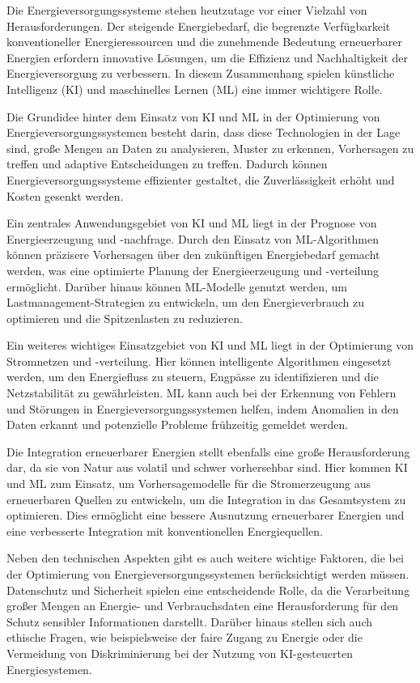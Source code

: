 Die Energieversorgungssysteme stehen heutzutage vor einer Vielzahl von
Herausforderungen. Der steigende Energiebedarf, die begrenzte Verfügbarkeit
konventioneller Energieressourcen und die zunehmende Bedeutung erneuerbarer
Energien erfordern innovative Lösungen, um die Effizienz und Nachhaltigkeit der
Energieversorgung zu verbessern. In diesem Zusammenhang spielen künstliche
Intelligenz (KI) und maschinelles Lernen (ML) eine immer wichtigere Rolle.

Die Grundidee hinter dem Einsatz von KI und ML in der Optimierung von
Energieversorgungssystemen besteht darin, dass diese Technologien in der Lage
sind, große Mengen an Daten zu analysieren, Muster zu erkennen, Vorhersagen zu
treffen und adaptive Entscheidungen zu treffen. Dadurch können
Energieversorgungssysteme effizienter gestaltet, die Zuverlässigkeit erhöht und
Kosten gesenkt werden.

Ein zentrales Anwendungsgebiet von KI und ML liegt in der Prognose von
Energieerzeugung und -nachfrage. Durch den Einsatz von ML-Algorithmen können
präzisere Vorhersagen über den zukünftigen Energiebedarf gemacht werden, was
eine optimierte Planung der Energieerzeugung und -verteilung ermöglicht.
Darüber hinaus können ML-Modelle genutzt werden, um Lastmanagement-Strategien
zu entwickeln, um den Energieverbrauch zu optimieren und die Spitzenlasten zu
reduzieren.

Ein weiteres wichtiges Einsatzgebiet von KI und ML liegt in der Optimierung von
Stromnetzen und -verteilung. Hier können intelligente Algorithmen eingesetzt
werden, um den Energiefluss zu steuern, Engpässe zu identifizieren und die
Netzstabilität zu gewährleisten. ML kann auch bei der Erkennung von Fehlern und
Störungen in Energieversorgungssystemen helfen, indem Anomalien in den Daten
erkannt und potenzielle Probleme frühzeitig gemeldet werden.

Die Integration erneuerbarer Energien stellt ebenfalls eine große
Herausforderung dar, da sie von Natur aus volatil und schwer vorhersehbar sind.
Hier kommen KI und ML zum Einsatz, um Vorhersagemodelle für die Stromerzeugung
aus erneuerbaren Quellen zu entwickeln, um die Integration in das Gesamtsystem
zu optimieren. Dies ermöglicht eine bessere Ausnutzung erneuerbarer Energien
und eine verbesserte Integration mit konventionellen Energiequellen.

Neben den technischen Aspekten gibt es auch weitere wichtige Faktoren, die bei
der Optimierung von Energieversorgungssystemen berücksichtigt werden müssen.
Datenschutz und Sicherheit spielen eine entscheidende Rolle, da die
Verarbeitung großer Mengen an Energie- und Verbrauchsdaten eine Herausforderung
für den Schutz sensibler Informationen darstellt. Darüber hinaus stellen sich
auch ethische Fragen, wie beispielsweise der faire Zugang zu Energie oder die
Vermeidung von Diskriminierung bei der Nutzung von KI-gesteuerten
Energiesystemen.

